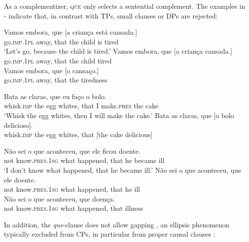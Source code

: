 \documentclass[output=paper,colorlinks,citecolor=brown,
]{langscibook}
\begin{document}
As a complementizer, \textsc{que} only selects a sentential complement. The examples in - indicate that, in contrast with TPs, small clauses or DPs are rejected:

\ea \label{ex:matos:vamos-embora}
 \ea \label{ex:matos:vamos-embora-a}
 \gll Vamos embora, que [a criança está cansada.]\\
      go.\textsc{imp}.\textsc{1pl} away, that the child is tired\\
 \glt ‘Let’s go, because the child is tired.’
 \ex \label{ex:matos:vamos-embora-b}
 \gll {*} Vamos embora, que [a criança cansada.]\\
      {} go.\textsc{imp}.\textsc{1pl} away, that the child tired\\
 \ex \label{ex:matos:vamos-embora-c}
 \gll {*} Vamos embora, que [o cansaço.]\\
      {} go.\textsc{imp}.\textsc{1pl} away, that the tiredness\\
 \z
\z 

\ea \label{ex:matos:bata-claras}
 \ea \label{ex:matos:bata-claras-a}
 \gll Bata as claras, que eu faço o bolo.\\
      whisk.\textsc{imp} the {egg whites}, that I make.\textsc{pres} the cake\\
 \glt ‘Whisk the egg whites, then I will make the cake.’
 \ex \label{ex:matos:bata-claras-b}
 \gll {*} Bata as claras, que [o bolo delicioso].\\
	  {} whisk.\textsc{imp} the {egg whites}, that [the cake delicious]\\
 \z
\z 

\ea \label{ex:matos:doente}
 \ea \label{ex:matos:doente-a}
 \gll Não sei {o que} aconteceu, que ele ficou doente.\\
      not know.\textsc{pres}.\textsc{1sg} what happened, that he became ill\\
 \glt ‘I don’t know what happened, that he became ill.’
 \ex \label{ex:matos:doente-b}
 \gll {*} Não sei {o que} aconteceu, que ele doente.\\
      {} not know.\textsc{pres}.\textsc{1sg} what happened, that he ill\\
 \ex \label{ex:matos:doente-c}
 \gll {*} Não sei {o que} aconteceu, que doença.\\
      {} not know.\textsc{pres}.\textsc{1sg} what happened, that illness\\
 \z
\z 

In addition, the \textit{que}-clause does not allow gapping , an ellipsis phenomenon typically excluded from CPs, in particular from proper causal clauses :
\end{document}
